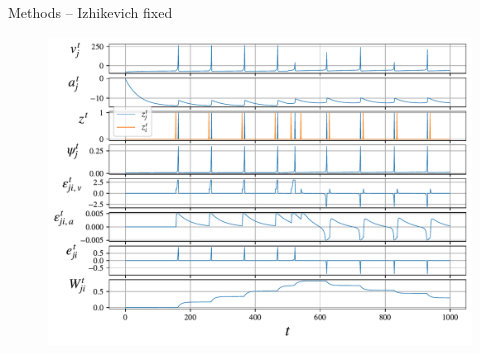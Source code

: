 \documentclass[t]{beamer}
\begin{document}
\begin{frame}{Methods -- Izhikevich fixed}
  \begin{figure}[!ht]
    \centering
    \includegraphics[width=0.8\linewidth]{demo_izh_corrected}
  \end{figure}
\end{frame}
\end{document}
